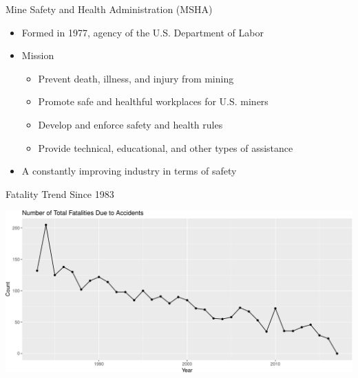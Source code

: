 \documentclass[]{beamer}
\providecommand{\tightlist}{%
  \setlength{\itemsep}{0pt}\setlength{\parskip}{0pt}}
\begin{document}
\begin{frame}{Mine Safety and Health Administration (MSHA)}

\begin{itemize}[<+->]
\tightlist
\item
  Formed in 1977, agency of the U.S. Department of Labor
\item
  Mission

  \begin{itemize}[<+->]
  \tightlist
  \item
    Prevent death, illness, and injury from mining
  \item
    Promote safe and healthful workplaces for U.S. miners
  \item
    Develop and enforce safety and health rules
  \item
    Provide technical, educational, and other types of assistance
  \end{itemize}
\item
  A constantly improving industry in terms of safety
\end{itemize}

\end{frame}

\begin{frame}{Fatality Trend Since 1983}

\begin{center}\includegraphics{presentation_slides_files/figure-beamer/fatality trend-1} \end{center}

\end{frame}
\end{document}
